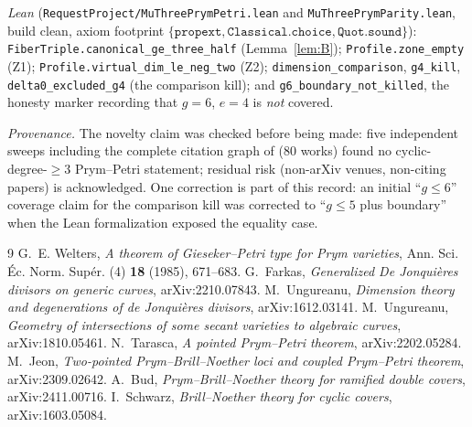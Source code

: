 \documentclass[11pt]{article}
\begin{document}
\emph{Lean} (\texttt{RequestProject/MuThreePrymPetri.lean} and
\texttt{MuThreePrymParity.lean}, build clean, axiom
footprint $\{\texttt{propext},\texttt{Classical.choice},\texttt{Quot.sound}\}$):
\texttt{FiberTriple.canonical\_ge\_three\_half} (Lemma~\ref{lem:B});
\texttt{Profile.zone\_empty} (Z1); \texttt{Profile.virtual\_dim\_le\_neg\_two}
(Z2); \texttt{dimension\_comparison}, \texttt{g4\_kill},
\texttt{delta0\_excluded\_g4} (the comparison kill); and
\texttt{g6\_boundary\_not\_killed}, the honesty marker recording that $g=6$,
$e=4$ is \emph{not} covered.

\emph{Provenance.}  The novelty claim was checked before being made: five
independent sweeps including the complete citation graph of \cite{welters}
(80 works) found no cyclic-degree-$\ge3$ Prym--Petri statement; residual risk
(non-arXiv venues, non-citing papers) is acknowledged.  One correction is part of
this record: an initial ``$g\le6$'' coverage claim for the comparison kill was
corrected to ``$g\le5$ plus boundary'' when the Lean formalization exposed the
equality case.

\begin{thebibliography}{9}
 G.~E. Welters, \emph{A theorem of Gieseker--Petri type for Prym
varieties}, Ann. Sci. \'Ec. Norm. Sup\'er. (4) \textbf{18} (1985), 671--683.
 G.~Farkas, \emph{Generalized De Jonqui\`eres divisors on generic
curves}, arXiv:2210.07843.
 M.~Ungureanu, \emph{Dimension theory and degenerations of
de Jonqui\`eres divisors}, arXiv:1612.03141.
 M.~Ungureanu, \emph{Geometry of intersections of some
secant varieties to algebraic curves}, arXiv:1810.05461.
 N.~Tarasca, \emph{A pointed Prym--Petri theorem},
arXiv:2202.05284.
 M.~Jeon, \emph{Two-pointed Prym--Brill--Noether loci and coupled
Prym--Petri theorem}, arXiv:2309.02642.
 A.~Bud, \emph{Prym--Brill--Noether theory for ramified double
covers}, arXiv:2411.00716.
 I.~Schwarz, \emph{Brill--Noether theory for cyclic covers},
arXiv:1603.05084.
\end{thebibliography}
\end{document}
